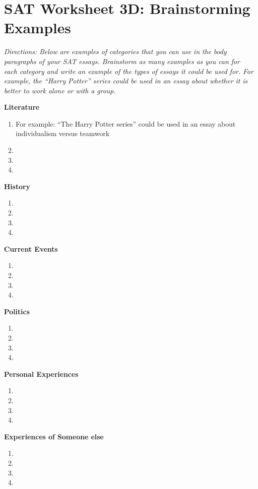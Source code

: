 \documentclass[12pt]{book}
\begin{document}
\newpage
\section[Brainstorming Ideas]{SAT Worksheet 3D: Brainstorming Examples}
\bigskip
\textit{Directions: Below are examples of categories that you can use in the body paragraphs of your SAT essays. Brainstorm as many examples as you can for each category and write an example of the types of essays it could be used for. For example, the “Harry Potter” series could be used in an essay about whether it is better to work alone or with a group.}

\begin{spacing}{2}
\textbf{Literature}
\begin{enumerate}
\item For example: ``The Harry Potter series'' could be used in an essay about individualism versus teamwork
\item
\item
\item
\end{enumerate}

\vfill
\textbf{History}
\begin{enumerate}
\item
\item
\item
\item
\end{enumerate}

\vfill
\textbf{Current Events}
\begin{enumerate}
\item
\item
\item
\item
\end{enumerate}
\end{spacing}

\newpage
\begin{spacing}{2}
\textbf{Politics}

\begin{enumerate}
\item
\item
\item
\item
\end{enumerate}

\vfill
\textbf{Personal Experiences}

\begin{enumerate}
\item
\item
\item
\item
\end{enumerate}

\vfill
\textbf{Experiences of Someone else}

\begin{enumerate}
\item
\item
\item
\item
\end{enumerate}
\end{spacing}
\vfill\vfill
\newpage
\end{document}
